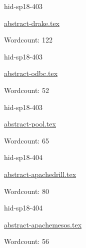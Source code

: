 

\begin{IU}

hid-sp18-403

\href{https://github.com/cloudmesh-community/hid-sp18-403/blob/master//technology/abstract-drake.tex}{abstract-drake.tex}

 

Wordcount: 122

\end{IU}



\begin{IU}

hid-sp18-403

\href{https://github.com/cloudmesh-community/hid-sp18-403/blob/master//technology/abstract-odbc.tex}{abstract-odbc.tex}

 

Wordcount: 52

\end{IU}



\begin{IU}

hid-sp18-403

\href{https://github.com/cloudmesh-community/hid-sp18-403/blob/master//technology/abstract-pool.tex}{abstract-pool.tex}

 

Wordcount: 65

\end{IU}



\begin{IU}

hid-sp18-404

\href{https://github.com/cloudmesh-community/hid-sp18-404/blob/master//technology/abstract-apachedrill.tex}{abstract-apachedrill.tex}

 

Wordcount: 80

\end{IU}



\begin{IU}

hid-sp18-404

\href{https://github.com/cloudmesh-community/hid-sp18-404/blob/master//technology/abstract-apachemesos.tex}{abstract-apachemesos.tex}

 

Wordcount: 56

\end{IU}

